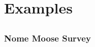 \documentclass[mathserif,compress]{beamer}\usepackage{graphicx, color}
\begin{document}

\section{Examples}
\subsection{}
\begin{frame}[fragile]
\frametitle{Nome Moose Survey}














\end{frame}
\end{document}
